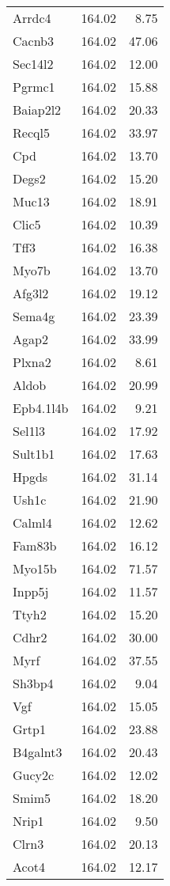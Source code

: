 \documentclass[oneside]{book}
\begin{document}
{\begin{longtable}{lrr}
  Arrdc4 & 164.02 & 8.75 \\
  Cacnb3 & 164.02 & 47.06 \\
  Sec14l2 & 164.02 & 12.00 \\
  Pgrmc1 & 164.02 & 15.88 \\
  Baiap2l2 & 164.02 & 20.33 \\
  Recql5 & 164.02 & 33.97 \\
  Cpd & 164.02 & 13.70 \\
  Degs2 & 164.02 & 15.20 \\
  Muc13 & 164.02 & 18.91 \\
  Clic5 & 164.02 & 10.39 \\
  Tff3 & 164.02 & 16.38 \\
  Myo7b & 164.02 & 13.70 \\
  Afg3l2 & 164.02 & 19.12 \\
  Sema4g & 164.02 & 23.39 \\
  Agap2 & 164.02 & 33.99 \\
  Plxna2 & 164.02 & 8.61 \\
  Aldob & 164.02 & 20.99 \\
  Epb4.1l4b & 164.02 & 9.21 \\
  Sel1l3 & 164.02 & 17.92 \\
  Sult1b1 & 164.02 & 17.63 \\
  Hpgds & 164.02 & 31.14 \\
  Ush1c & 164.02 & 21.90 \\
  Calml4 & 164.02 & 12.62 \\
  Fam83b & 164.02 & 16.12 \\
  Myo15b & 164.02 & 71.57 \\
  Inpp5j & 164.02 & 11.57 \\
  Ttyh2 & 164.02 & 15.20 \\
  Cdhr2 & 164.02 & 30.00 \\
  Myrf & 164.02 & 37.55 \\
  Sh3bp4 & 164.02 & 9.04 \\
  Vgf & 164.02 & 15.05 \\
  Grtp1 & 164.02 & 23.88 \\
  B4galnt3 & 164.02 & 20.43 \\
  Gucy2c & 164.02 & 12.02 \\
  Smim5 & 164.02 & 18.20 \\
  Nrip1 & 164.02 & 9.50 \\
  Clrn3 & 164.02 & 20.13 \\
  Acot4 & 164.02 & 12.17 \\

\end{longtable}}
\end{document}
